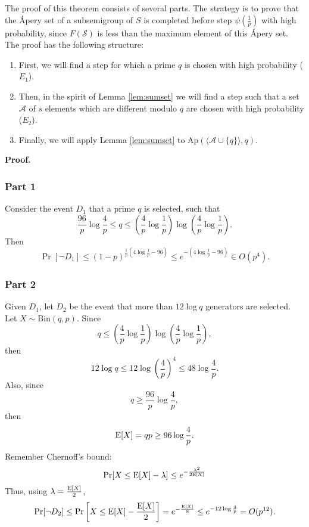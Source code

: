 \par The proof of this theorem consists of several parts. The strategy is to prove that the Ápery set of a subsemigroup of $S$ is completed before step $\psi\left(\frac{1}{p}\right)$ with high probability, since $F(\mathcal{S})$ is less than the maximum element of this Ápery set. The proof has the following structure: 
\begin{enumerate}
\item First, we will find a step for which a prime $q$ is chosen with high probability ($E_1$). 
\item Then, in the spirit of Lemma \ref{lem:sumset} we will find a step such that a set $\mathcal{A}$ of $s$ elements which are different modulo $q$ are chosen with high probability ($E_2$). 
\item Finally, we will apply Lemma \ref{lem:sumset} to $\mathrm{Ap}(\langle \mathcal{A} \cup \{q\}\rangle, q)$.
\end{enumerate}
\textbf{Proof. }
\subsubsection*{Part 1} 
Consider the event $D_1$ that a prime $q$ is selected, such that
\[\frac{96}{p}\log \frac{4}{p} \leq q \leq \left(\frac{4}{p}\log \frac{1}{p}\right)\log\left(\frac{4}{p}\log \frac{1}{p}\right).\]
Then
\[\Pr[\lnot D_1] \leq (1 - p)^{\frac{1}{p}\left(4\log\frac{1}{p} - 96\right)} \leq e^{-\left(4\log\frac{1}{p} - 96\right)} \in  O(p^4).\]
\subsubsection*{Part 2}

Given $D_1$, let $D_2$ be the event that more than $12\log q$ generators are selected. 
    Let $X \sim \mathrm{Bin}(q, p)$. Since 
    \[q \leq \left(\frac{4}{p}\log \frac{1}{p}\right)\log\left(\frac{4}{p}\log \frac{1}{p}\right),\]
    then
    \[12\log q \leq 12\log \left(\frac{4}{p}\right)^4 \leq 48\log\frac{4}{p}.\]
    Also, since 
    \[q \geq \frac{96}{p}\log\frac{4}{p},\]
    then 
    \[\mathrm{E}[X]  = qp \geq 96\log\frac{4}{p}.\]
    Remember Chernoff's bound: 
    \begin{equation}
        \mathrm{Pr}[X \leq \mathrm{E}[X] - \lambda] \leq e^{-\frac{\lambda^2}{2\mathrm{E}[X]}} 
    \end{equation}
    Thus, using $\lambda = \frac{\mathrm{E}[X]}{2}$,
    \begin{equation}
        \mathrm{Pr}[\lnot D_2] \leq \mathrm{Pr}\left[X \leq \mathrm{E}[X] - \frac{\mathrm{E}[X]}{2}\right] = e^{-\frac{\mathrm{E}[X]}{8}} \leq e^{-12\log \frac{4}{p}} = O(p^{12}).
    \end{equation}


